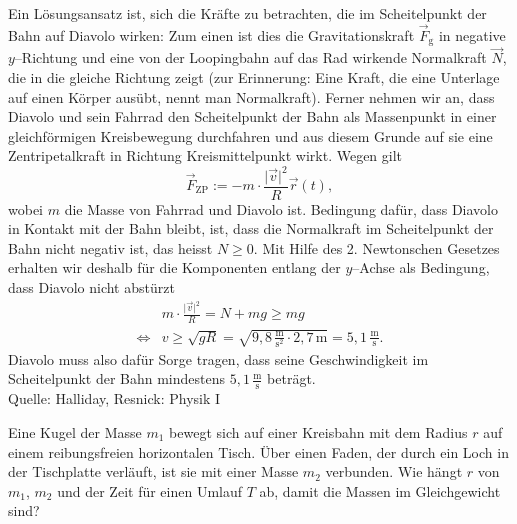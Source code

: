 \begin{MExercises}
\begin{MExercise}
  
  \begin{MSolution}
   Ein L\"osungsansatz ist, sich die Kr\"afte zu betrachten, die im Scheitelpunkt der Bahn auf Diavolo wirken: Zum einen ist dies die Gravitationskraft $\vec{F}_{\textrm{g}}$ in negative $y$--Richtung und eine von der Loopingbahn auf das Rad wirkende Normalkraft $\vec{N}$, die in die gleiche Richtung zeigt (zur Erinnerung: Eine Kraft, die eine Unterlage auf einen K\"orper aus\"ubt, nennt man Normalkraft). Ferner nehmen wir an, dass Diavolo und sein Fahrrad den Scheitelpunkt der Bahn als Massenpunkt in einer gleichf\"ormigen Kreisbewegung durchfahren und aus diesem Grunde auf sie  eine Zentripetalkraft in Richtung Kreismittelpunkt wirkt. Wegen   gilt
   \begin{equation*}
   \vec{F}_{\textrm{ZP}}:=-m\cdot \frac{\vert \vec{v}\vert^2}{R}\vec{r}(t),
   \end{equation*}
   wobei $m$ die Masse von Fahrrad und Diavolo ist. Bedingung daf\"ur, dass Diavolo in Kontakt mit der Bahn bleibt, ist, dass die Normalkraft im Scheitelpunkt der Bahn nicht negativ ist, das heisst $N\geq 0$. Mit Hilfe des 2. Newtonschen Gesetzes erhalten wir deshalb f\"ur die Komponenten entlang der $y$--Achse als Bedingung, dass Diavolo nicht abst\"urzt
  \begin{eqnarray*}
  &m\cdot \frac{\vert \vec{v}\vert^2}{R}= N+mg\ge mg\\
  \Leftrightarrow &v\ge\sqrt{gR}=\sqrt{9{,}8\,\frac{\text{m}}{\text{s}^2}\cdot 2{,}7\,\text{m}}=5{,}1\,\frac{\text{m}}{\text{s}}.
  \end{eqnarray*}
  Diavolo muss also daf\"ur Sorge tragen, dass seine Geschwindigkeit im Scheitelpunkt der Bahn mindestens $5{,}1\,\frac{\text{m}}{\text{s}}$ betr\"agt.\\
  
  Quelle: Halliday, Resnick: Physik I
  
  \end{MSolution}
  \end{MExercise}
  
  \begin{MExercise}
  Eine Kugel der Masse $m_1$ bewegt sich auf einer Kreisbahn mit dem Radius $r$ auf einem reibungsfreien horizontalen Tisch. \"Uber einen Faden, der durch ein Loch in der Tischplatte verl\"auft, ist sie mit einer Masse $m_2$ verbunden. Wie h\"angt $r$ von $m_1$, $m_2$ und der Zeit f\"ur einen Umlauf $T$ ab, damit die Massen im Gleichgewicht sind?
  

\end{MExercise}
\end{MExercises}
